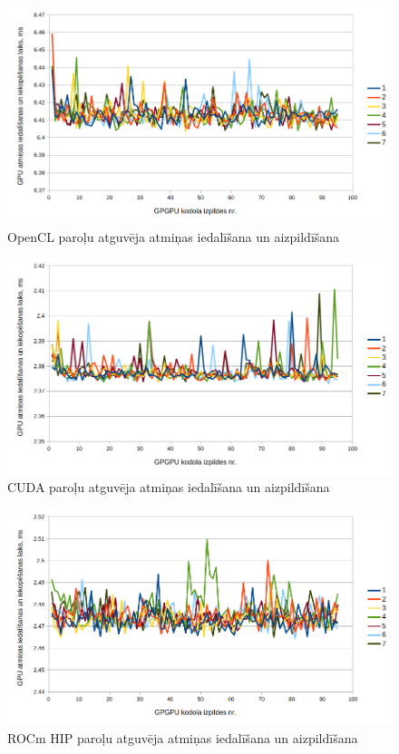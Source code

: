 \begin{figure}[H] \centering
    \includegraphics[width=\textwidth]{images/sha_buf_creation_cl.png}
    \caption{OpenCL paroļu atguvēja atmiņas iedalīšana un aizpildīšana}
    \label{img:sha_buf_creation_cl}
\end{figure}


\begin{figure}[H] \centering
    \includegraphics[width=\textwidth]{images/sha_buf_creation_cuda.png}
    \caption{CUDA paroļu atguvēja atmiņas iedalīšana un aizpildīšana}
    \label{img:sha_buf_creation_cuda}
\end{figure}


\begin{figure}[H] \centering
    \includegraphics[width=\textwidth]{images/sha_buf_creation_hip.png}
    \caption{ROCm HIP paroļu atguvēja atmiņas iedalīšana un aizpildīšana}
    \label{img:sha_buf_creation_hip}
\end{figure}

